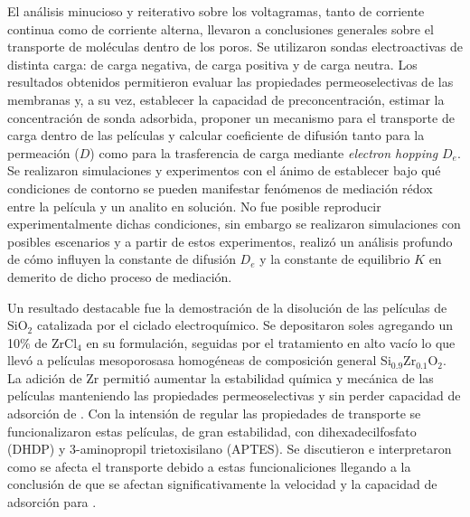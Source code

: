 El análisis minucioso y reiterativo sobre los voltagramas, tanto de corriente continua como de corriente alterna, llevaron a conclusiones generales sobre el transporte de moléculas dentro de los poros. Se utilizaron sondas electroactivas de distinta carga: \ferroferri\space de carga negativa, \aminorutenio\space de carga positiva y \ferroceno\space de carga neutra. Los resultados obtenidos permitieron evaluar las propiedades permeoselectivas de las membranas y, a su vez, establecer la capacidad de preconcentración, estimar la concentración de sonda adsorbida, proponer un mecanismo para el transporte de carga dentro de las películas y calcular coeficiente de difusión tanto para la permeación ($D$) como para la trasferencia de carga mediante \textit{electron hopping} $D_e$.
 Se realizaron simulaciones y experimentos con el ánimo de establecer bajo qué condiciones de contorno se pueden manifestar fenómenos de mediación rédox entre la película y un analito en solución. No fue posible reproducir experimentalmente dichas condiciones, sin embargo se realizaron simulaciones con posibles escenarios y a partir de estos experimentos, realizó un análisis profundo de cómo influyen la constante de difusión $D_e$ y la constante de equilibrio $K$ en demerito de dicho proceso de mediación. 

Un resultado destacable fue la demostración de la disolución de las películas de SiO$_2$ catalizada por el ciclado electroquímico. Se depositaron soles agregando un 10\% de  ZrCl$_4$ en su formulación, seguidas por el tratamiento en alto vacío lo que llevó a películas mesoporosasa homogéneas de composición general Si$_{0.9}$Zr$_{0.1}$O$_2$. La adición de Zr permitió aumentar la estabilidad química y mecánica de las películas manteniendo las propiedades permeoselectivas y sin perder capacidad de adsorción de \aminorutenio. Con la intensión de regular las propiedades de transporte se funcionalizaron estas películas, de gran estabilidad, con dihexadecilfosfato (DHDP) y 3-aminopropil trietoxisilano (APTES). Se discutieron e interpretaron como se afecta el transporte debido a estas funcionaliciones llegando a la conclusión de que se afectan significativamente la velocidad y la capacidad de adsorción para \ru.


